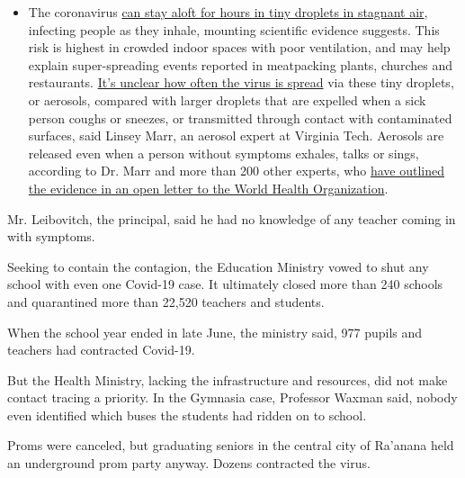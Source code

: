 \begin{itemize}
  \begin{itemize}
  \tightlist
  \item
    The coronavirus
    \href{https://www.nytimes.com/2020/07/04/health/239-experts-with-one-big-claim-the-coronavirus-is-airborne.html?action=click\&pgtype=Article\&state=default\&region=MAIN_CONTENT_3\&context=storylines_faq}{can
    stay aloft for hours in tiny droplets in stagnant air}, infecting
    people as they inhale, mounting scientific evidence suggests. This
    risk is highest in crowded indoor spaces with poor ventilation, and
    may help explain super-spreading events reported in meatpacking
    plants, churches and restaurants.
    \href{https://www.nytimes.com/2020/07/06/health/coronavirus-airborne-aerosols.html?action=click\&pgtype=Article\&state=default\&region=MAIN_CONTENT_3\&context=storylines_faq}{It's
    unclear how often the virus is spread} via these tiny droplets, or
    aerosols, compared with larger droplets that are expelled when a
    sick person coughs or sneezes, or transmitted through contact with
    contaminated surfaces, said Linsey Marr, an aerosol expert at
    Virginia Tech. Aerosols are released even when a person without
    symptoms exhales, talks or sings, according to Dr. Marr and more
    than 200 other experts, who
    \href{https://academic.oup.com/cid/article/doi/10.1093/cid/ciaa939/5867798}{have
    outlined the evidence in an open letter to the World Health
    Organization}.
  \end{itemize}
\end{itemize}

Mr. Leibovitch, the principal, said he had no knowledge of any teacher
coming in with symptoms.

Seeking to contain the contagion, the Education Ministry vowed to shut
any school with even one Covid-19 case. It ultimately closed more than
240 schools and quarantined more than 22,520 teachers and students.

When the school year ended in late June, the ministry said, 977 pupils
and teachers had contracted Covid-19.

But the Health Ministry, lacking the infrastructure and resources, did
not make contact tracing a priority. In the Gymnasia case, Professor
Waxman said, nobody even identified which buses the students had ridden
on to school.

Proms were canceled, but graduating seniors in the central city of
Ra'anana held an underground prom party anyway. Dozens contracted the
virus.

